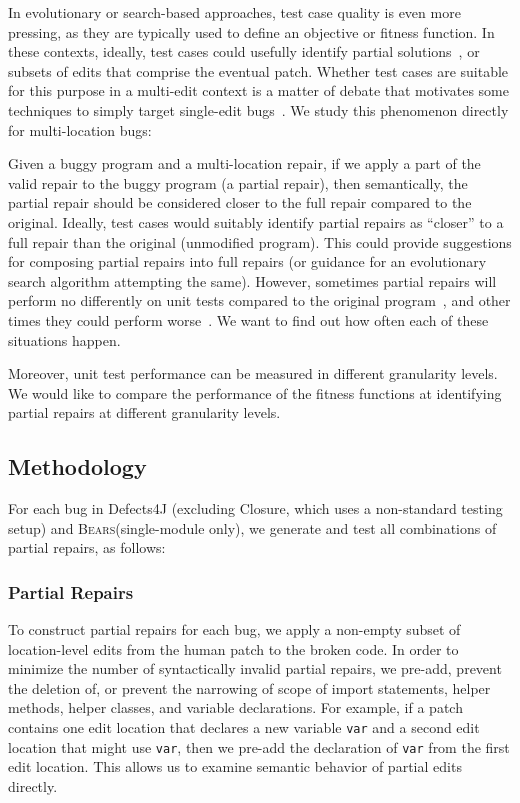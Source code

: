 \documentclass[10pt, conference]{IEEEtran}
\newcommand\bears{\textsc{Bears}\xspace}
\begin{document}
In evolutionary or search-based approaches, test case quality is
even more pressing, as they are typically used to define an objective or
fitness function.  In these contexts, ideally, test cases could usefully
identify partial solutions~\cite{better-fitness}, or subsets of edits that comprise the eventual
patch. Whether test cases are suitable for this purpose in a multi-edit context
is a matter of debate that motivates some techniques to simply target
single-edit bugs~\cite{ae,rsrepair}. We study this phenomenon directly for
multi-location bugs:


Given a buggy program and a multi-location repair, if we apply a part of the valid repair to 
the buggy program (a partial repair), then semantically, the partial repair should be considered closer
 to the full repair compared to the original.
Ideally, test cases would suitably identify partial repairs as ``closer'' to a 
full repair than the original (unmodified program).
This could provide suggestions for composing partial repairs into full repairs 
(or guidance for an evolutionary search algorithm attempting the same).
However, sometimes partial repairs will perform no differently on unit tests compared
to the original program~\cite{chris-thesis, source-code-checkpoint},
and other times they could perform worse~\cite{gecco09}. We want to find
out how often each of these situations happen.

Moreover, unit test performance can be measured in different granularity levels. 
We would like to compare the performance of the fitness functions at identifying 
partial repairs at different granularity levels.


\subsection{Methodology}
\label{sec:partial-repair-methodology}

For each bug in Defects4J
(excluding Closure, which uses a non-standard testing setup)
and \bears (single-module only), we generate and test all combinations of partial repairs, as follows: 

\subsubsection{Partial Repairs}

To construct partial repairs for each bug, we apply a non-empty subset 
of location-level edits from the human patch to the broken code.
In order to minimize the number of syntactically invalid partial repairs, 
we pre-add, prevent the deletion of, or prevent the narrowing of scope of 
import statements, helper methods, helper classes, and variable declarations.
For example, if a patch contains one edit location that declares a new variable 
\texttt{var} and a second edit location that might use \texttt{var}, then we 
pre-add the declaration of \texttt{var} from the first edit location. 
This allows us to examine semantic behavior of partial edits directly.
\end{document}
